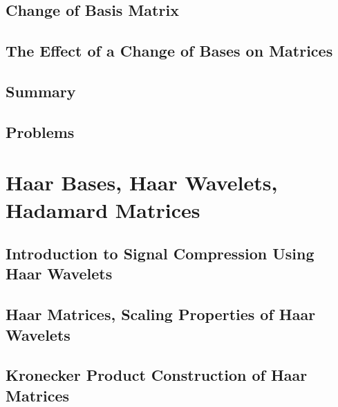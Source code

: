 \documentclass[a4paper]{article}
\begin{document}
\subsection{ Change of Basis Matrix} %

\subsection{ The Effect of a Change of Bases on Matrices} %

\subsection{ Summary} %

\subsection{ Problems} %


\newpage
\section{Haar Bases, Haar Wavelets, Hadamard Matrices}
\subsection{ Introduction to Signal Compression Using Haar Wavelets} %

\subsection{ Haar Matrices, Scaling Properties of Haar Wavelets} %

\subsection{ Kronecker Product Construction of Haar Matrices} %
\end{document}
